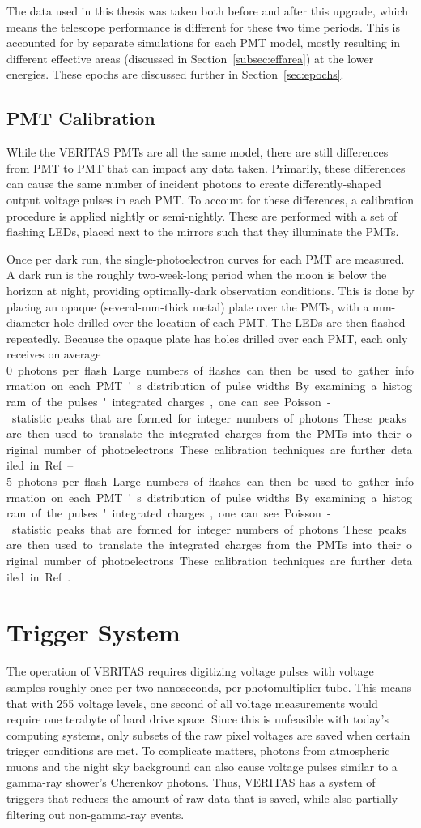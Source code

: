 The data used in this thesis was taken both before and after this upgrade, which means the telescope performance is different for these two time periods.
This is accounted for by separate simulations for each PMT model, mostly resulting in different effective areas (discussed in Section~\ref{subsec:effarea}) at the lower energies.
These epochs are discussed further in Section~\ref{sec:epochs}.


\subsection{PMT Calibration}

While the VERITAS PMTs are all the same model, there are still differences from PMT to PMT that can impact any data taken.
Primarily, these differences can cause the same number of incident photons to create differently-shaped output voltage pulses in each PMT.
To account for these differences, a calibration procedure is applied nightly or semi-nightly.
These are performed with a set of flashing LEDs, placed next to the mirrors such that they illuminate the PMTs.

Once per dark run, the single-photoelectron curves for each PMT are measured.
A dark run is the roughly two-week-long period when the moon is below the horizon at night, providing optimally-dark observation conditions.
This is done by placing an opaque (several-mm-thick metal) plate over the PMTs, with a mm-diameter hole drilled over the location of each PMT.
The LEDs are then flashed repeatedly.
Because the opaque plate has holes drilled over each PMT, each only receives on average \SIrange{0}{5} photons per flash.
Large numbers of flashes can then be used to gather information on each PMT's distribution of pulse widths.
By examining a histogram of the pulses' integrated charges, one can see Poisson-statistic peaks that are formed for integer numbers of photons.
These peaks are then used to translate the integrated charges from the PMTs into their original number of photoelectrons.
These calibration techniques are further detailed in Ref.~\cite{calib_techniques}.


\section{Trigger System}\label{sec:trig}

The operation of VERITAS requires digitizing voltage pulses with voltage samples roughly once per two nanoseconds, per photomultiplier tube.
This means that with 255 voltage levels, one second of all voltage measurements would require one terabyte of hard drive space.
Since this is unfeasible with today's computing systems, only subsets of the raw pixel voltages are saved when certain trigger conditions are met.
To complicate matters, photons from atmospheric muons and the night sky background can also cause voltage pulses similar to a gamma-ray shower's Cherenkov photons.
Thus, VERITAS has a system of triggers that reduces the amount of raw data that is saved, while also partially filtering out non-gamma-ray events.

